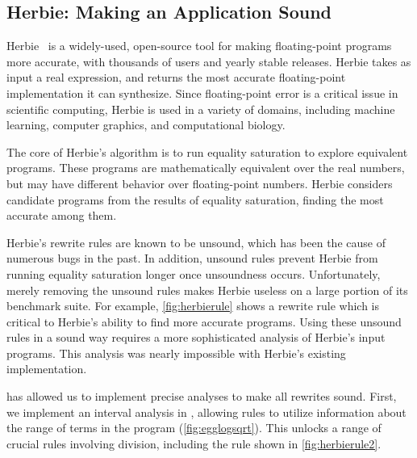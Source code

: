 \subsection{Herbie: Making an \eqsat Application Sound}
\label{sec:herbie}


Herbie~\cite{herbie} is a widely-used, open-source tool
 for making floating-point programs more accurate,
 with thousands of users and yearly stable releases.
Herbie takes as input a real expression,
 and returns the most accurate floating-point implementation
 it can synthesize.
Since floating-point error is a critical issue
 in scientific computing,
 Herbie is used in a variety of domains,
 including machine learning, computer graphics,
 and computational biology.


The core of Herbie's algorithm
 is to run equality saturation to explore equivalent programs.
These programs are mathematically equivalent
 over the real numbers,
 but may have different behavior over floating-point numbers.
Herbie considers candidate programs from the
 results of equality saturation,
 finding the most accurate among them.

Herbie's rewrite rules are known to be unsound,
 which has been the cause of numerous bugs in the past.
In addition, unsound rules prevent Herbie from running equality saturation
  longer once unsoundness occurs.
Unfortunately, merely removing the unsound rules makes Herbie
  useless on a large portion of its benchmark suite.
For example, \autoref{fig:herbierule} shows a rewrite rule which
  is critical to Herbie's ability to find more accurate programs.
Using these unsound rules in a sound way requires a more sophisticated
  analysis of Herbie's input programs.
This analysis was nearly impossible with Herbie's existing \egraph implementation.

\Egglog has allowed us to implement precise analyses to
 make all rewrites sound.
First, we implement an interval analysis in \egglog, allowing rules to
  utilize information about the range of terms in the program (\autoref{fig:egglogsqrt}).
This unlocks a range of crucial rules involving division, including the rule shown in \autoref{fig:herbierule2}.


